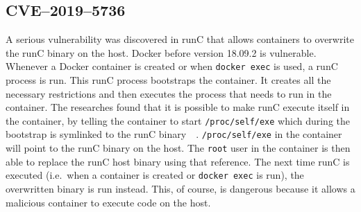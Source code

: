 \subsection{CVE--2019--5736}\label{CVE-2019-5736}
A serious vulnerability was discovered in runC that allows containers to overwrite the runC binary on the host. Docker before version 18.09.2 is vulnerable. Whenever a Docker container is created or when \lstinline{docker exec} is used, a runC process is run. This runC process bootstraps the container. It creates all the necessary restrictions and then executes the process that needs to run in the container. The researches found that it is possible to make runC execute itself in the container, by telling the container to start \lstinline{/proc/self/exe} which during the bootstrap is symlinked to the runC binary~\cite{CVE-2019-5736-DragonSector}~\cite{CVE-2019-5736-Github}. \lstinline{/proc/self/exe} in the container will point to the runC binary on the host. The \lstinline{root} user in the container is then able to replace the runC host binary using that reference. The next time runC is executed (i.e.\ when a container is created or \lstinline{docker exec} is run), the overwritten binary is run instead. This, of course, is dangerous because it allows a malicious container to execute code on the host.
